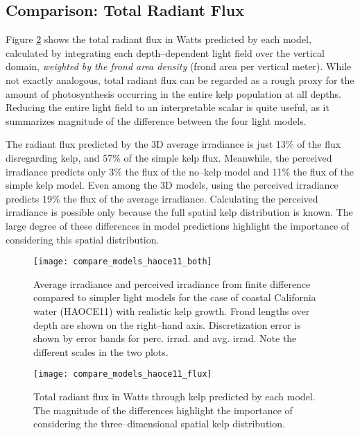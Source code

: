 \subsection{Comparison: Total Radiant Flux}
Figure \ref{fig:compare_models_haoce11_flux} shows the total radiant flux in Watts predicted by each model, calculated by integrating each depth--dependent light field over the vertical domain, \textit{weighted by the frond area density} (frond area per vertical meter).
While not exactly analogous, total radiant flux can be regarded as a rough proxy for the amount of photosynthesis occurring in the entire kelp population at all depths.
Reducing the entire light field to an interpretable scalar is quite useful, as it summarizes magnitude of the difference between the four light models.

The radiant flux predicted by the 3D average irradiance is just 13\% of the flux disregarding kelp, and 57\% of the simple kelp flux.
Meanwhile, the perceived irradiance predicts only 3\% the flux of the no--kelp model and 11\% the flux of the simple kelp model.
Even among the 3D models, using the perceived irradiance predicts 19\% the flux of the average irradiance.
Calculating the perceived irradiance is possible only because the full spatial kelp distribution is known.
The large degree of these differences in model predictions highlight the importance of considering this spatial distribution.

\begin{figure}[H]
  \centering
  \texttt{[image: compare\_models\_haoce11\_both]}
  \caption{Average irradiance and perceived irradiance from finite difference compared to simpler light models for the case of coastal California water (HAOCE11) with realistic kelp growth. Frond lengths over depth are shown on the right--hand axis. Discretization error is shown by error bands for perc. irrad. and avg. irrad. Note the different scales in the two plots.}
  \label{fig:compare_models_haoce11_both}
\end{figure}

\begin{figure}[H]
  \centering
  \texttt{[image: compare\_models\_haoce11\_flux]}
  \caption{Total radiant flux in Watts through kelp predicted by each model. The magnitude of the differences highlight the importance of considering the three--dimensional spatial kelp distribution.}
  \label{fig:compare_models_haoce11_flux}
\end{figure}


